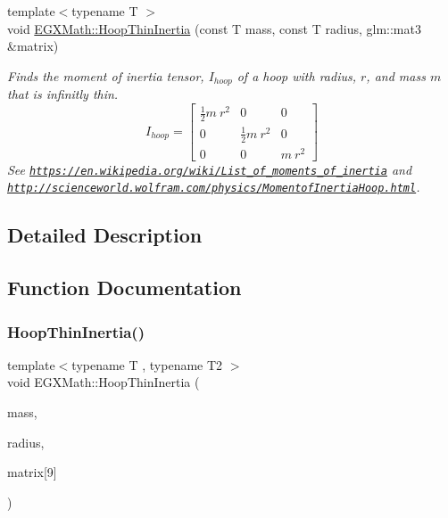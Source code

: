 \begin{DoxyCompactItemize}
{\footnotesize template$<$typename T $>$ }\\void \mbox{\hyperlink{group___e_g_x_math-_geometry-3_d-_hoop_ga810ed1548ab8825b8830b97cfcbcfe11}{E\+G\+X\+Math\+::\+Hoop\+Thin\+Inertia}} (const T mass, const T radius, glm\+::mat3 \&matrix)
\begin{DoxyCompactList}\small\item\em Finds the moment of inertia tensor, $I_{hoop}$ of a hoop with radius, $r$, and mass $m$ that is infinitly thin. \[ I_{hoop}=\begin{bmatrix} \frac{1}{2}m\ r^2 & 0 & 0\\ 0 & \frac{1}{2}m\ r^2 & 0\\ 0 & 0 & m\ r^2 \end{bmatrix} \] See \href{https://en.wikipedia.org/wiki/List_of_moments_of_inertia}{\tt https\+://en.\+wikipedia.\+org/wiki/\+List\+\_\+of\+\_\+moments\+\_\+of\+\_\+inertia} and \href{http://scienceworld.wolfram.com/physics/MomentofInertiaHoop.html}{\tt http\+://scienceworld.\+wolfram.\+com/physics/\+Momentof\+Inertia\+Hoop.\+html}. \end{DoxyCompactList}\end{DoxyCompactItemize}


\subsection{Detailed Description}


\subsection{Function Documentation}
\mbox{\label{group___e_g_x_math-_geometry-3_d-_hoop_gab3a84dc2aa29ce0db990425747d291c6}} 
\subsubsection{\texorpdfstring{Hoop\+Thin\+Inertia()}{HoopThinInertia()}\hspace{0.1cm}{\footnotesize\ttfamily [1/3]}}
{\footnotesize\ttfamily template$<$typename T , typename T2 $>$ \\
void E\+G\+X\+Math\+::\+Hoop\+Thin\+Inertia (\begin{DoxyParamCaption}\item[{const T}]{mass,  }\item[{const T}]{radius,  }\item[{T2(\&)}]{matrix\mbox{[}9\mbox{]} }\end{DoxyParamCaption})}



